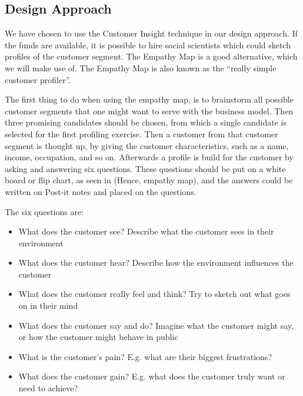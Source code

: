 \subsection{Design Approach}
We have chosen to use the Customer Insight\cite[p. 127-133]{canvas} technique in our design approach. If the funds are available, it is possible to hire social scientists which could sketch profiles of the customer segment. The Empathy Map is a good alternative, which we will make use of. The Empathy Map is also known as the ``really simple customer profiler''\cite[p. 131]{canvas}.

The first thing to do when using the empathy map, is to brainstorm all possible customer segments that one might want to serve with the business model. Then three promising candidates should be chosen, from which a single candidate is selected for the first profiling exercise. Then a customer from that customer segment is thought up, by giving the customer characteristics, such as a name, income, occupation, and so on. Afterwards a profile is build for the customer by asking and answering six questions\cite[p. 131]{canvas}. These questions should be put on a white board or flip chart, as seen in (Hence, empathy map), and the answers could be written on Post-it notes and placed on the questions.

The six questions are:
\begin{itemize}
\item What does the customer see? Describe what the customer sees in their environment
\item What does the customer hear? Describe how the environment influences the customer
\item What does the customer really feel and think? Try to sketch out what goes on in their mind
\item What does the customer say and do? Imagine what the customer might say, or how the customer might behave in public
\item What is the customer's pain? E.g. what are their biggest frustrations?
\item What does the customer gain? E.g. what does the customer truly want or need to achieve?
\end{itemize}

